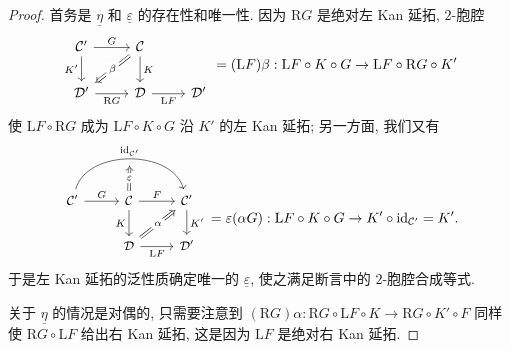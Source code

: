 \begin{proof}
	首务是 $\underline{\eta}$ 和 $\underline{\varepsilon}$ 的存在性和唯一性. 因为 $\mathrm{R}G$ 是绝对左 Kan 延拓, $2$-胞腔
	\[\begin{tikzcd}
		\mathcal{C}' \arrow[r, "G"] \arrow[d, "{K'}"'] & \mathcal{C} \arrow[d, "K"] \arrow[Rightarrow, ld, "\beta" description] & \\
		\mathcal{D}' \arrow[r, "{\mathrm{R}G}"'] & \mathcal{D} \arrow[r, "{\mathrm{L}F}"'] & \mathcal{D}'
	\end{tikzcd} = (\mathrm{L}F)\beta : \mathrm{L}F \circ K \circ G \to \mathrm{L}F \circ \mathrm{R}G \circ K' \]
	使 $\mathrm{L}F \circ \mathrm{R}G$ 成为 $\mathrm{L}F \circ K \circ G$ 沿 $K'$ 的左 Kan 延拓; 另一方面, 我们又有
	\[\begin{tikzcd}[every cell/.append style = {font = \small}]
		\mathcal{C}' \arrow[r, "G"] \arrow[bend left=75, rr, "{\identity_{\mathcal{C}'}}", ""' {name=I}] & \mathcal{C} \arrow[r, "F"] \arrow[d, "K"'] \arrow[Rightarrow, to=I, "\varepsilon" description] & \mathcal{C}' \arrow[d, "{K'}"] \\
		& \mathcal{D} \arrow[r, "{\mathrm{L}F}"'] \arrow[Rightarrow, ru, "\alpha" description] & \mathcal{D}'
	\end{tikzcd} = \varepsilon(\alpha G) : \mathrm{L}F \circ K \circ G \to K' \circ \identity_{\mathcal{C}'} = K' . \]
	于是左 Kan 延拓的泛性质确定唯一的 $\underline{\varepsilon}$, 使之满足断言中的 $2$-胞腔合成等式.
	
	关于 $\underline{\eta}$ 的情况是对偶的, 只需要注意到 $(\mathrm{R}G)\alpha: \mathrm{R}G \circ \mathrm{L}F \circ K \to \mathrm{R}G \circ K' \circ F$ 同样使 $\mathrm{R}G \circ \mathrm{L}F$ 给出右 Kan 延拓, 这是因为 $\mathrm{L}F$ 是绝对右 Kan 延拓.
	

\end{proof}
